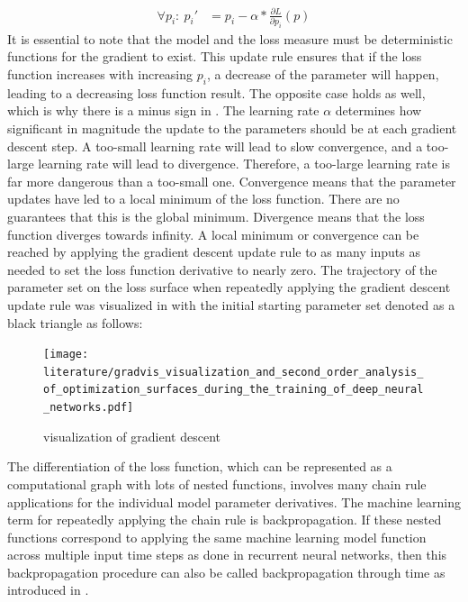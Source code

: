\documentclass[draft,final]{vutinfth} %
\begin{document}
    \begin{align}
        \label{gradient_descent_update}
        \forall p_i:~p_i' &= p_i - \alpha * \frac{\partial{L}}{\partial{p_i}}(p)
    \end{align}
    It is essential to note that the model and the loss measure must be deterministic functions for the gradient to exist.
    This update rule ensures that if the loss function increases with increasing $p_i$, a decrease of the parameter will happen, leading to a decreasing loss function result.
    The opposite case holds as well, which is why there is a minus sign in .
    The learning rate $\alpha$ determines how significant in magnitude the update to the parameters should be at each gradient descent step.
    A too-small learning rate will lead to slow convergence, and a too-large learning rate will lead to divergence.
    Therefore, a too-large learning rate is far more dangerous than a too-small one.
    Convergence means that the parameter updates have led to a local minimum of the loss function.
    There are no guarantees that this is the global minimum. Divergence means that the loss function diverges towards infinity.
    A local minimum or convergence can be reached by applying the gradient descent update rule to as many inputs as needed to set the loss function derivative to nearly zero.
    The trajectory of the parameter set on the loss surface when repeatedly applying the gradient descent update rule was visualized in \cite[p. 2]{gradient_descent_vis} with the initial starting parameter set denoted as a black triangle as follows:
    \begin{figure}[H]
        \centering{}
        \texttt{[image: literature/gradvis\_visualization\_and\_second\_order\_analysis\_of\_optimization\_surfaces\_during\_the\_training\_of\_deep\_neural\_networks.pdf]}
        \caption{visualization of gradient descent}
        \label{fig:gradient_descent_vis}
    \end{figure}
    The differentiation of the loss function, which can be represented as a computational graph with lots of nested functions, involves many chain rule applications for the individual model parameter derivatives. The machine learning term for repeatedly applying the chain rule is backpropagation.
    If these nested functions correspond to applying the same machine learning model function across multiple input time steps as done in recurrent neural networks, then this backpropagation procedure can also be called backpropagation through time as introduced in \cite[p. 6-12]{GradientDescent}.
\end{document}
